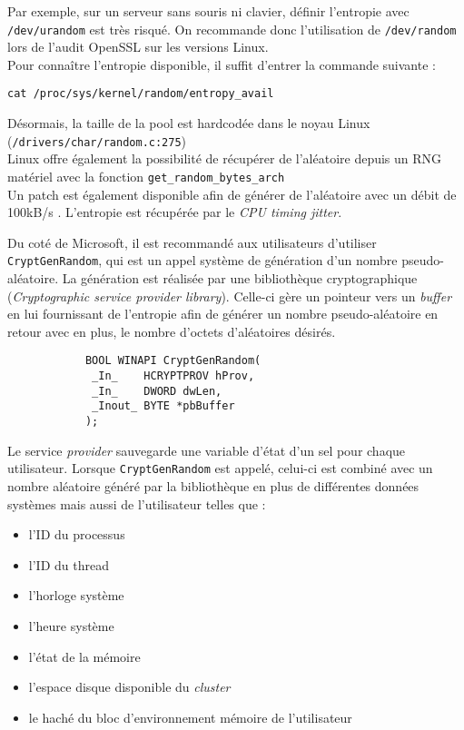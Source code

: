 			Par exemple, sur un serveur sans souris ni clavier, définir l'entropie avec	\texttt{/dev/urandom} est très risqué. On recommande donc l'utilisation de \texttt{/dev/random} lors de l'audit OpenSSL sur les versions Linux.\\
	
			Pour connaître l'entropie disponible, il suffit d'entrer la commande suivante :
			\begin{center}
				\texttt{cat /proc/sys/kernel/random/entropy\_avail}
			\end{center}	
			
			Désormais, la taille de la pool est hardcodée dans le noyau Linux (\texttt{/drivers/char/random.c:275})\\
			
			Linux offre également la possibilité de récupérer de l'aléatoire depuis un RNG matériel avec la fonction \texttt{get\_random\_bytes\_arch}\\
		
			Un patch est également disponible afin de générer de l'aléatoire avec un débit de 100kB/s \cite{mueller2013rng}. L'entropie est récupérée par le \textit{CPU timing jitter}.\\
			
		
			Du coté de Microsoft, il est recommandé aux utilisateurs d'utiliser \texttt{CryptGenRandom}, \cite{wikicryptgenrandom} qui est un appel système de génération d'un nombre pseudo-aléatoire. La génération est réalisée par une bibliothèque cryptographique (\textit{Cryptographic service provider library}). Celle-ci gère un pointeur vers un \textit{buffer} en lui fournissant de l'entropie afin de générer un nombre pseudo-aléatoire en retour avec en plus, le nombre d'octets d'aléatoires désirés.
			
			\begin{verbatim}
			BOOL WINAPI CryptGenRandom(
			 _In_    HCRYPTPROV hProv,
			 _In_    DWORD dwLen,
			 _Inout_ BYTE *pbBuffer
			);
			\end{verbatim}
			
			Le service \textit{provider} sauvegarde une variable d'état d'un sel pour chaque utilisateur. Lorsque \texttt{CryptGenRandom} est appelé, celui-ci est combiné avec un nombre aléatoire généré par la bibliothèque en plus de différentes données systèmes mais aussi de l'utilisateur telles que :\\
			\begin{itemize}
			\item l'ID du processus
			\item l'ID du thread
			\item l'horloge système
			\item l'heure système
			\item l'état de la mémoire
			\item l'espace disque disponible du \textit{cluster}
			\item le haché du bloc d'environnement mémoire de l'utilisateur\\
			\end{itemize} 
			
